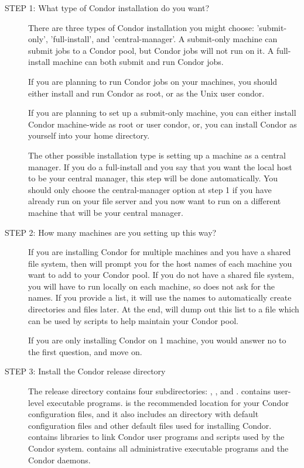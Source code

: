 \begin{description}
\item[STEP 1: What type of Condor installation do you want?]

     There are three types of Condor installation you might choose:
     'submit-only', 'full-install', and 'central-manager'.  A
     submit-only machine can submit jobs to a Condor pool, but Condor
     jobs will not run on it.  A full-install machine can both submit
     and run Condor jobs.  

     If you are planning to run Condor jobs on your machines, you
     should either install and run Condor as root, or as the Unix
     user condor.  

     If you are planning to set up a submit-only machine, you can
     either install Condor machine-wide as root or user condor, or,
     you can install Condor as yourself into your home directory.

     The other possible installation type is setting up a machine as a
     central manager.  If you do a full-install and you say that you
     want the local host to be your central manager, this step will be
     done automatically.  You should only choose the central-manager
     option at step 1 if you have already run  on your
     file server and you now want to run  on a different
     machine that will be your central manager.

\item[STEP 2: How many machines are you setting up this way?]

     If you are installing Condor for multiple machines and you have
     a shared file system, then  will prompt you for the
     host names of each machine you want to add to your Condor pool.
     If you do not have a shared file system, you will have to run
      locally on each machine, so 
     does not
     ask for the names.  If you provide a list, it will
     use the names to automatically create directories and files
     later.  At the end,  will dump out this list to a
      file which can be used by scripts to help maintain your
     Condor pool.

     If you are only installing Condor on 1 machine, you would
     answer no to the first question, and move on.

\item[STEP 3: Install the Condor release directory] 
     The release directory contains four subdirectories: 
     , ,
      and .  
      contains user-level executable programs.
      is the recommended location for your Condor configuration
     files, and
     it also includes an  directory with default
     configuration files
     and other default files used for installing Condor.   contains
     libraries to link Condor user programs and scripts used by the
     Condor system.   contains all administrative executable
     programs and the Condor daemons.  


\end{description}
